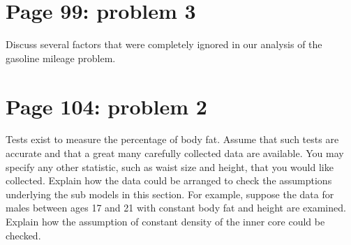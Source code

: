 \documentclass[]{article}
\begin{document}
\section{Page 99: problem 3}\label{page-99-problem-3}

Discuss several factors that were completely ignored in our analysis of
the gasoline mileage problem.

\section{Page 104: problem 2}\label{page-104-problem-2}

Tests exist to measure the percentage of body fat. Assume that such
tests are accurate and that a great many carefully collected data are
available. You may specify any other statistic, such as waist size and
height, that you would like collected. Explain how the data could be
arranged to check the assumptions underlying the sub models in this
section. For example, suppose the data for males between ages 17 and 21
with constant body fat and height are examined. Explain how the
assumption of constant density of the inner core could be checked.
\end{document}
